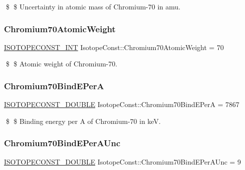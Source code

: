 \$ \$ Uncertainty in atomic mass of Chromium-\/70 in amu. \mbox{\label{group___isotope_const-_chromium-_cr70_gaaae42fd0c0dc1a558370cb8ee9773f25}} 
\subsubsection{\texorpdfstring{Chromium70\+Atomic\+Weight}{Chromium70AtomicWeight}}
{\footnotesize\ttfamily \mbox{\hyperlink{group___isotope_const-_macros_ga5f18360b3e99483a35c32d789e62621c}{I\+S\+O\+T\+O\+P\+E\+C\+O\+N\+S\+T\+\_\+\+I\+NT}} Isotope\+Const\+::\+Chromium70\+Atomic\+Weight = 70}

\$ \$ Atomic weight of Chromium-\/70. \mbox{\label{group___isotope_const-_chromium-_cr70_ga5877519b1a878ad6e082f156fb2a2d31}} 
\subsubsection{\texorpdfstring{Chromium70\+Bind\+E\+PerA}{Chromium70BindEPerA}}
{\footnotesize\ttfamily \mbox{\hyperlink{group___isotope_const-_macros_ga8f45a7272ce02c0b4c65c44636ed719a}{I\+S\+O\+T\+O\+P\+E\+C\+O\+N\+S\+T\+\_\+\+D\+O\+U\+B\+LE}} Isotope\+Const\+::\+Chromium70\+Bind\+E\+PerA = 7867}

\$ \$ Binding energy per A of Chromium-\/70 in keV. \mbox{\label{group___isotope_const-_chromium-_cr70_gaaa949adaf952b9fe05fc16b148aacca0}} 
\subsubsection{\texorpdfstring{Chromium70\+Bind\+E\+Per\+A\+Unc}{Chromium70BindEPerAUnc}}
{\footnotesize\ttfamily \mbox{\hyperlink{group___isotope_const-_macros_ga8f45a7272ce02c0b4c65c44636ed719a}{I\+S\+O\+T\+O\+P\+E\+C\+O\+N\+S\+T\+\_\+\+D\+O\+U\+B\+LE}} Isotope\+Const\+::\+Chromium70\+Bind\+E\+Per\+A\+Unc = 9}

